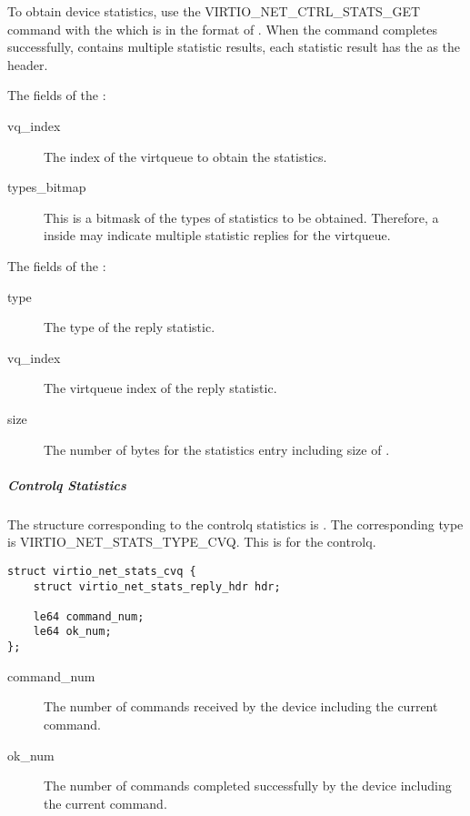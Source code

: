 To obtain device statistics, use the VIRTIO_NET_CTRL_STATS_GET command with the
 which is in the format of
. When the command completes
successfully,  contains multiple statistic
results, each statistic result has the 
as the header.

The fields of the :
\begin{description}
    \item [vq_index]
        The index of the virtqueue to obtain the statistics.

    \item [types_bitmap]
        This is a bitmask of the types of statistics to be obtained. Therefore, a
         inside  may
        indicate multiple statistic replies for the virtqueue.
\end{description}

The fields of the :
\begin{description}
    \item [type]
        The type of the reply statistic.

    \item [vq_index]
        The virtqueue index of the reply statistic.

    \item [size]
        The number of bytes for the statistics entry including size of .

\end{description}

\subparagraph{Controlq Statistics}\label{sec:Device Types / Network Device / Device Operation / Control Virtqueue / Device Statistics / Controlq Statistics}

The structure corresponding to the controlq statistics is
. The corresponding type is
VIRTIO_NET_STATS_TYPE_CVQ. This is for the controlq.

\begin{lstlisting}
struct virtio_net_stats_cvq {
    struct virtio_net_stats_reply_hdr hdr;

    le64 command_num;
    le64 ok_num;
};
\end{lstlisting}

\begin{description}
    \item [command_num]
        The number of commands received by the device including the current command.

    \item [ok_num]
        The number of commands completed successfully by the device including the current command.
\end{description}


